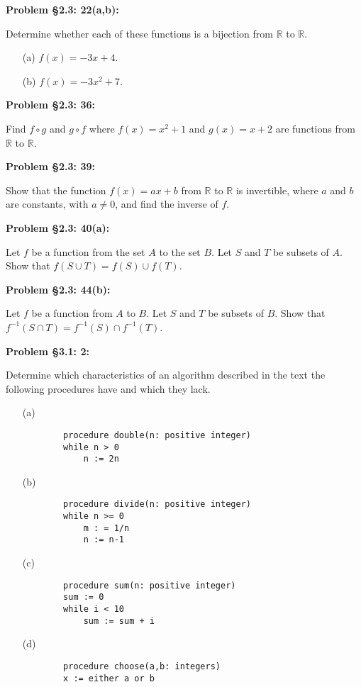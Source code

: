 \documentclass{article}
\newenvironment{problem}[1]
    {\begin{mdframed}[default]
    \textbf{Problem #1:}
    }
    {\end{mdframed}
    }
\begin{document}
\begin{problem}{\S 2.3: 22(a,b)}
Determine whether each of these functions is a bijection from $\mathbb{R}$ to $\mathbb{R}$.
\begin{enumerate}
    \item[(a)] $f(x) = -3x + 4$.
    \item[(b)] $f(x) = -3x^2 + 7$.
\end{enumerate}
\end{problem}

\begin{problem}{\S 2.3: 36}
Find $f \circ g$ and $g \circ f$ where $f(x) = x^2 + 1$ and $g(x) = x+2$ are functions from $\mathbb{R}$ to $\mathbb{R}$.
\end{problem}

\begin{problem}{\S 2.3: 39}
    Show that the function $f(x) = ax + b$ from $\mathbb{R}$ to $\mathbb{R}$ is invertible, where $a$ and $b$ are constants, with $a \neq 0$, and find the inverse of $f$.
\end{problem}

\begin{problem}{\S 2.3: 40(a)}
Let $f$ be a function from the set $A$ to the set $B$. Let $S$ and $T$ be subsets of $A$. Show that $f(S \cup T) = f(S) \cup f(T)$.
\end{problem}

\begin{problem}{\S 2.3: 44(b)}
Let $f$ be a function from $A$ to $B$. Let $S$ and $T$ be subsets of $B$. Show that $f^{-1}(S \cap T) = f^{-1}(S) \cap f^{-1}(T)$.
\end{problem}

\begin{problem}{\S 3.1: 2}
Determine which characteristics of an algorithm described in the text the following procedures have and which they lack.
\begin{enumerate}
    \item[(a)]
    \begin{verbatim}
        procedure double(n: positive integer)
        while n > 0
            n := 2n
    \end{verbatim}
    \item[(b)]
    \begin{verbatim}
        procedure divide(n: positive integer)
        while n >= 0
            m : = 1/n
            n := n-1
    \end{verbatim}
    \item[(c)]
    \begin{verbatim}
        procedure sum(n: positive integer)
        sum := 0
        while i < 10
            sum := sum + i
    \end{verbatim}
    \item[(d)]
    \begin{verbatim}
        procedure choose(a,b: integers)
        x := either a or b
    \end{verbatim}
\end{enumerate}
\end{problem}
\end{document}
